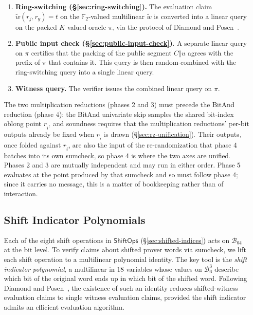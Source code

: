 \documentclass{article}
\theoremstyle{definition}
\newcommand*{\mle}{\widetilde}
\newcommand{\BB}{\mathcal{B}}
\newcommand{\FF}[1]{\mathbb{F}_{#1}}
\begin{document}
\begin{enumerate}
\item \textbf{Ring-switching (\S\ref{sec:ring-switching}).} The evaluation claim $\mle{w}(r_j, r_y) = t$ on the $\FF{2}$-valued multilinear $\mle{w}$ is converted into a linear query on the packed $K$-valued oracle $\pi$, via the protocol of Diamond and Posen~\cite{Diamond:2024ab}.
\item \textbf{Public input check (\S\ref{sec:public-input-check}).} A separate linear query on $\pi$ certifies that the packing of the public segment $C \mathbin{\Vert} u$ agrees with the prefix of $\pi$ that contains it. This query is then random-combined with the ring-switching query into a single linear query.
\item \textbf{Witness query.} The verifier issues the combined linear query on $\pi$.
\end{enumerate}

The two multiplication reductions (phases 2 and 3) must precede the BitAnd reduction (phase 4): the BitAnd univariate skip samples the shared bit-index oblong point $r_{\widehat{i}}$, and soundness requires that the multiplication reductions' per-bit outputs already be fixed when $r_{\widehat{i}}$ is drawn (\S\ref{sec:rz-unification}). Their outputs, once folded against $r_{\widehat{i}}$, are also the input of the re-randomization that phase 4 batches into its own sumcheck, so phase 4 is where the two axes are unified. Phases 2 and 3 are mutually independent and may run in either order. Phase 5 evaluates at the point produced by that sumcheck and so must follow phase 4; since it carries no message, this is a matter of bookkeeping rather than of interaction.

\subsection{Shift Indicator Polynomials}
\label{sec:shift-indicators}

Each of the eight shift operations in $\textsf{ShiftOps}$ (\S\ref{sec:shifted-indices}) acts on $\BB_{64}$ at the bit level. To verify claims about shifted prover words via sumcheck, we lift each shift operation to a multilinear polynomial identity. The key tool is the \emph{shift indicator polynomial}, a multilinear in $18$ variables whose values on $\BB_6^3$ describe which bit of the original word ends up in which bit of the shifted word. Following Diamond and Posen~\cite[\S 4.3]{Diamond:2025aa}, the existence of such an identity reduces shifted-witness evaluation claims to single witness evaluation claims, provided the shift indicator admits an efficient evaluation algorithm.
\end{document}
